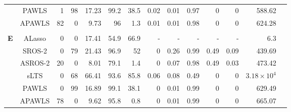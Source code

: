 \documentclass{article}\usepackage[]{graphicx}\usepackage[]{color}
\begin{document}
\begin{table}[thp]
\begin{center}
\begin{tabular}{ccrrrrrrrrrrrr}
	      & PAWLS & 1 & 98 & 17.23 & 
	      99.2 & 38.5 &
	      0.02 & 0.01 & 0.97
	      & 0 & 0 & 588.62\\
	      
	      & APAWLS & 82 & 0 & 9.73 & 
	      96 & 1.3 &
	      0.01 & 0.01 & 0.98
	      & 0 & 0 & 624.28\\
	      
	      \\
	       	  \multirow{8}{*}{{\bf E}}
	      & ALasso & 0 & 0 & 17.41 & 
	      54.9 & 66.9 & - & - & - & - & - & 6.3\\
	      
	      & SROS-2 & 0 & 79 & 21.43 & 
	      96.9 & 52 &
	      0 & 0.26 & 0.99
	      & 0.49 & 0.09 & 439.69\\
	      
	     & ASROS-2 & 20 & 0 & 8.01 & 
	      79.1 & 1.4 &
	      0 & 0.07 & 0.98
	      & 0.49 & 0.03 & 473.42\\
	      
	       & sLTS & 0 & 68 & 66.41 & 
	      93.6 & 85.8 &
	      0.06 & 0.08 & 0.49
	      & 0 & 0 & \ensuremath{3.18\times 10^{4}}\\
	      
	      & PAWLS & 0 & 99 & 16.89 & 
	      99.1 & 38.1 &
	      0 & 0.01 & 0.99
	      & 0 & 0 & 629.49\\
	      
	      & APAWLS & 78 & 0 & 9.62 & 
	      95.8 & 0.8 &
	      0 & 0.01 & 0.99
	      & 0 & 0 & 665.07\\
	      
	   \hline\hline
	
	\end{tabular}
	\end{center}
	\end{table}
	
	
\end{document}
